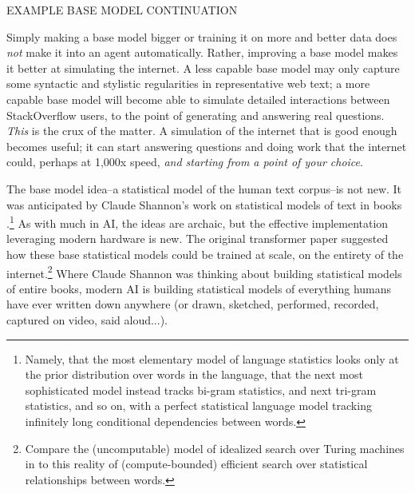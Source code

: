 EXAMPLE BASE MODEL CONTINUATION

Simply making a base model bigger or training it on more and better data does
\emph{not} make it into an agent automatically. Rather, improving a base model
makes it better at simulating the internet. A less capable base model may only
capture some syntactic and stylistic regularities in representative web text; a
more capable base model will become able to simulate detailed interactions
between StackOverflow users, to the point of generating and answering real
questions. \emph{This} is the crux of the matter. A simulation of the internet
that is good enough becomes useful; it can start answering questions and doing
work that the internet could, perhaps at 1,000x speed, \emph{and starting from
a point of your choice}.

The base model idea--a statistical model of the human text corpus--is not new.
It was anticipated by Claude Shannon's work on statistical models of text in
books \cite{shannon1951english}.\footnote{Namely, that the most elementary
model of language statistics looks only at the prior distribution over words in
the language, that the next most sophisticated model instead tracks bi-gram
statistics, and next tri-gram statistics, and so on, with a perfect statistical
language model tracking infinitely long conditional dependencies between
words.} As with much in AI, the ideas are archaic, but the effective
implementation leveraging modern hardware is new. The original transformer
paper suggested how these base statistical models could be trained at scale, on
the entirety of the internet.\footnote{Compare the (uncomputable) model of
idealized search over Turing machines in \cite{hutter2000aixi} to this reality
of (compute-bounded) efficient search over statistical relationships between
words.} Where Claude Shannon was thinking about building statistical models of
entire books, modern AI is building statistical models of everything humans
have ever written down anywhere (or drawn, sketched, performed, recorded,
captured on video, said aloud...).


